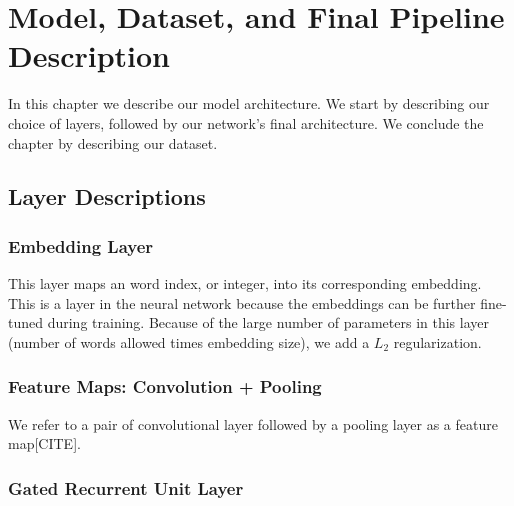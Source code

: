 
\chapter{Model, Dataset, and Final Pipeline Description}

In this chapter we describe our model architecture. We start by describing our choice of layers, followed by
our network's final architecture.
We conclude the chapter by
describing our dataset.

\section{Layer Descriptions}
\subsection{Embedding Layer}
This layer maps an word index, or integer, into its corresponding embedding. This is a layer in the
neural network because the embeddings can be further fine-tuned during training. Because of the large number of
parameters in this layer (number of words allowed times embedding size), we add a $L_2$ regularization.

\subsection{Feature Maps: Convolution + Pooling}

We refer to a pair of convolutional layer followed by a pooling layer as a feature map[CITE].

\subsection{Gated Recurrent Unit Layer}

